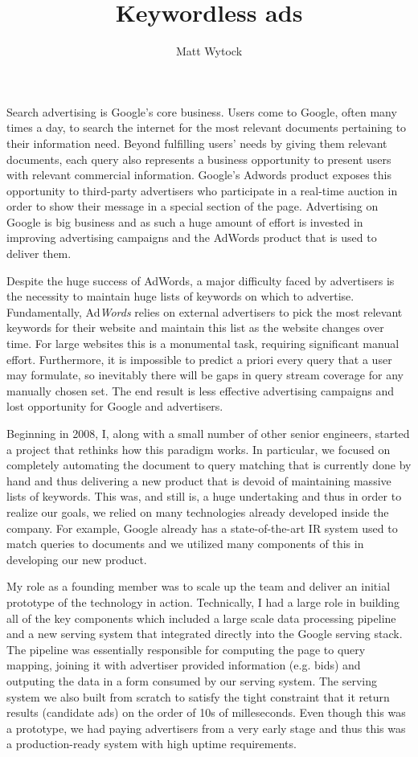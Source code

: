 \documentclass[12pt]{article}
\title{Keywordless ads}
\author{Matt Wytock}
\begin{document}
\maketitle

Search advertising is Google's core business. Users come to Google, often many times a day, to search the internet for the most relevant documents pertaining to their information need. Beyond fulfilling users' needs by giving them relevant documents, each query also represents a business opportunity to present users with relevant commercial information. Google's Adwords product exposes this opportunity to third-party advertisers who participate in a real-time auction in order to show their message in a special section of the page. Advertising on Google is big business and as such a huge amount of effort is invested in improving advertising campaigns and the AdWords product that is used to deliver them.

Despite the huge success of AdWords, a major difficulty faced by advertisers is the necessity to maintain huge lists of keywords on which to advertise. Fundamentally, Ad\emph{Words} relies on external advertisers to pick the most relevant keywords for their website and maintain this list as the website changes over time. For large websites this is a monumental task, requiring significant manual effort. Furthermore, it is impossible to predict a priori every query that a user may formulate, so inevitably there will be gaps in query stream coverage for any manually chosen set. The end result is less effective advertising campaigns and lost opportunity for Google and advertisers.

Beginning in 2008, I, along with a small number of other senior engineers, started a project that rethinks how this paradigm works. In particular, we focused on completely automating the document to query matching that is currently done by hand and thus delivering a new product that is devoid of maintaining massive lists of keywords. This was, and still is, a huge undertaking and thus in order to realize our goals, we relied on many technologies already developed inside the company. For example, Google already has a state-of-the-art IR system used to match queries to documents and we utilized many components of this in developing our new product.

My role as a founding member was to scale up the team and deliver an initial prototype of the technology in action. Technically, I had a large role in building all of the key components which included a large scale data processing pipeline and a new serving system that integrated directly into the Google serving stack. The pipeline was essentially responsible for computing the page to query mapping, joining it with advertiser provided information (e.g. bids) and outputing the data in a form consumed by our serving system. The serving system we also built from scratch to satisfy the tight constraint that it return results (candidate ads) on the order of 10s of milleseconds. Even though this was a prototype, we had paying advertisers from a very early stage and thus this was a production-ready system with high uptime requirements.
\end{document}
